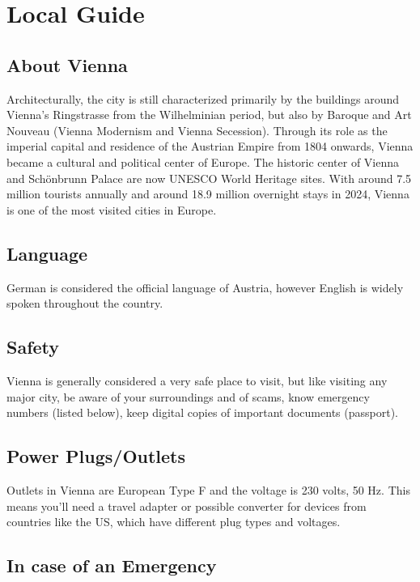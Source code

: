 \chapter{Local Guide}
\vspace*{0.2cm}

\section*{About Vienna}

Architecturally, the city is still characterized primarily by the buildings around Vienna’s Ringstrasse from the Wilhelminian period, but also by Baroque and Art Nouveau (Vienna Modernism and Vienna Secession). Through its role as the imperial capital and residence of the Austrian Empire from 1804 onwards, Vienna became a cultural and political center of Europe. The historic center of Vienna and Schönbrunn Palace are now UNESCO World Heritage sites. With around 7.5 million tourists annually and around 18.9 million overnight stays in 2024, Vienna is one of the most visited cities in Europe.


\section*{Language}

German is considered the official language of Austria, however English is widely spoken throughout the country.


\section*{Safety}

Vienna is generally considered a very safe place to visit, but like visiting any major city, be aware of your surroundings and of scams, know emergency numbers (listed below), keep digital copies of important documents (passport).

\section*{Power Plugs/Outlets}

Outlets in Vienna are European Type F and the voltage is 230 volts, 50 Hz. This means you'll need a travel adapter or possible converter for devices from countries like the US, which have different plug types and voltages. 

\section*{In case of an Emergency}

